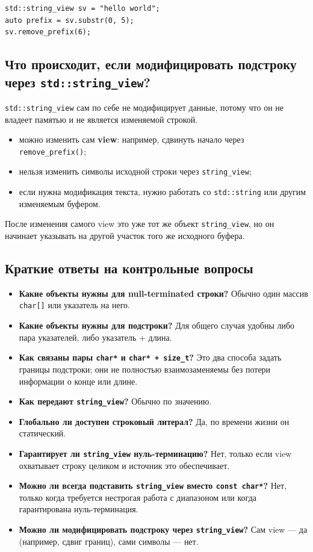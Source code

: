 \begin{example}
\begin{verbatim}
std::string_view sv = "hello world";
auto prefix = sv.substr(0, 5);
sv.remove_prefix(6);
\end{verbatim}
\end{example}

\subsection{Что происходит, если модифицировать подстроку через \texttt{std::string\_view}?}
\texttt{std::string\_view} сам по себе не модифицирует данные, потому что он не владеет памятью и не является изменяемой строкой.

\begin{itemize}
    \item можно изменить сам \textbf{view}: например, сдвинуть начало через \texttt{remove\_prefix()};
    \item нельзя изменить символы исходной строки через \texttt{string\_view};
    \item если нужна модификация текста, нужно работать со \texttt{std::string} или другим изменяемым буфером.
\end{itemize}

\begin{remark}
После изменения самого view это уже тот же объект \texttt{string\_view}, но он начинает указывать на другой участок того же исходного буфера.
\end{remark}

\subsection{Краткие ответы на контрольные вопросы}
\begin{itemize}
    \item \textbf{Какие объекты нужны для null-terminated строки?} Обычно один массив \texttt{char[]} или указатель на него.
    \item \textbf{Какие объекты нужны для подстроки?} Для общего случая удобны либо пара указателей, либо указатель + длина.
    \item \textbf{Как связаны пары \texttt{char*} и \texttt{char* + size\_t}?} Это два способа задать границы подстроки; они не полностью взаимозаменяемы без потери информации о конце или длине.
    \item \textbf{Как передают \texttt{string\_view}?} Обычно по значению.
    \item \textbf{Глобально ли доступен строковый литерал?} Да, по времени жизни он статический.
    \item \textbf{Гарантирует ли \texttt{string\_view} нуль-терминацию?} Нет, только если view охватывает строку целиком и источник это обеспечивает.
    \item \textbf{Можно ли всегда подставить \texttt{string\_view} вместо \texttt{const char*}?} Нет, только когда требуется нестрогая работа с диапазоном или когда гарантирована нуль-терминация.
    \item \textbf{Можно ли модифицировать подстроку через \texttt{string\_view}?} Сам view — да (например, сдвиг границ), сами символы — нет.
\end{itemize}

